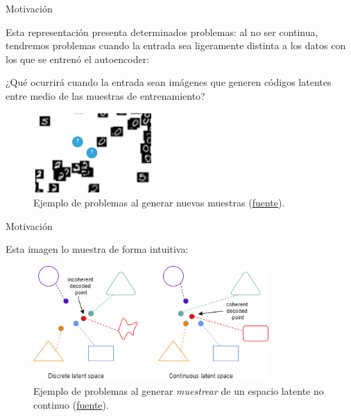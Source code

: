 \begin{frame}{Motivación}

Esta representación presenta determinados problemas: al no ser continua, tendremos problemas cuando la entrada sea ligeramente distinta a los datos con los que se entrenó el autoencoder:

¿Qué ocurrirá cuando la entrada sean imágenes que generen códigos latentes entre medio de las muestras de entrenamiento?

\begin{figure}
    \centering
    \includegraphics[width=0.4\textwidth]{Slides/figures/02_Metodos_Generativos/ae-zoom-latent-space.png}
    \caption{Ejemplo de problemas al generar nuevas muestras (\href{https://indico.ictp.it/event/8674/session/155/contribution/1121/material/slides/0.pdf}{fuente}).}
    \label{fig:enter-label}
\end{figure}

\end{frame}


\begin{frame}{Motivación}

Esta imagen lo muestra de forma intuitiva:

\begin{figure}
    \centering
    \includegraphics[width=0.8\textwidth]{Slides/figures/02_Metodos_Generativos/ae vs vae sampling.png}
    \caption{Ejemplo de problemas al generar \textit{muestrear} de un espacio latente no continuo (\href{https://www.researchgate.net/publication/349939162/figure/fig1/AS:999624672305152@1615340502225/Simplified-representation-of-the-compression-resulting-from-a-vanilla-Autoencoder-left.ppm}{fuente}).}
    \label{fig:enter-label}
\end{figure}

\end{frame}


